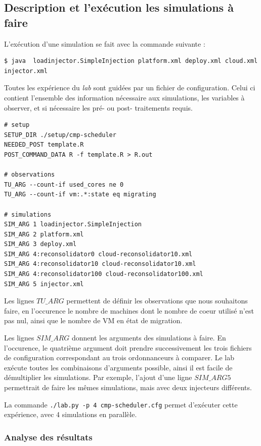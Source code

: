 \documentclass[parallelisme]{compas2017}
\begin{document}
\subsection{Description et l'exécution les simulations à faire}

L'exécution d'une simulation se fait avec la commande suivante : 
\begin{verbatim}
$ java  loadinjector.SimpleInjection platform.xml deploy.xml cloud.xml
injector.xml
\end{verbatim}

Toutes les expérience du \emph{lab} sont guidées par un fichier de 
configuration. Celui ci contient l'ensemble des information nécessaire aux 
simulations, les variables à observer, et si nécessaire les pré- ou post- 
traitements requis. 

\begin{lstlisting}
# setup
SETUP_DIR ./setup/cmp-scheduler
NEEDED_POST template.R
POST_COMMAND_DATA R -f template.R > R.out

# observations
TU_ARG --count-if used_cores ne 0
TU_ARG --count-if vm:.*:state eq migrating

# simulations
SIM_ARG 1 loadinjector.SimpleInjection
SIM_ARG 2 platform.xml 
SIM_ARG 3 deploy.xml
SIM_ARG 4:reconsolidator0 cloud-reconsolidator10.xml
SIM_ARG 4:reconsolidator10 cloud-reconsolidator10.xml 
SIM_ARG 4:reconsolidator100 cloud-reconsolidator100.xml
SIM_ARG 5 injector.xml
\end{lstlisting}

Les lignes \texttt{$TU\_ARG$} permettent de définir les observations que nous 
souhaitons faire, en l'occurence le nombre de machines dont le nombre de coeur 
utilisé n'est pas nul, ainsi que le nombre de VM en état de migration.

Les lignes \texttt{$SIM\_ARG$} donnent les arguments des simulations à faire. 
En l'occurence, le quatrième argument doit prendre successivement les trois 
fichiers de configuration correspondant au trois ordonnanceurs à comparer. 
Le lab exécute toutes les combinaisons d'arguments possible, ainsi il est 
facile de démultiplier les simulations. Par exemple, l'ajout d'une ligne 
\texttt{$SIM\_ARG 5$} permettrait de faire les mêmes simulations, mais avec 
deux injecteurs différents.

La commande \texttt{./lab.py -p 4 cmp-scheduler.cfg} permet d'exécuter 
cette expérience, avec 4 simulations en parallèle.

\subsubsection{Analyse des résultats}
\end{document}
